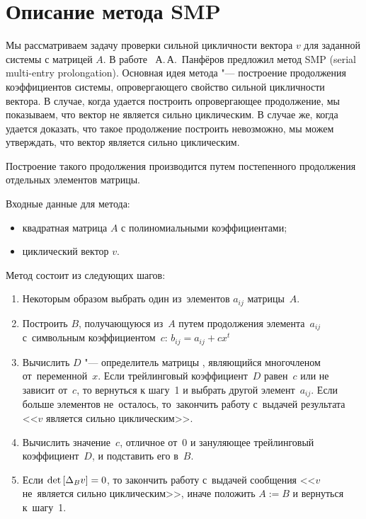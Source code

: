 \section{Описание метода SMP}

Мы рассматриваем задачу проверки сильной цикличности вектора $v$ для заданной системы с матрицей $A$.
В работе~\cite{litPanferov} А.\,А.~Панфёров предложил метод SMP (serial multi-entry prolongation).
Основная идея метода "--- построение продолжения коэффициентов системы,
опровергающего свойство сильной цикличности вектора.
В случае, когда удается построить опровергающее продолжение, мы показываем, что вектор не является сильно циклическим.
В случае же, когда удается доказать, что такое продолжение построить невозможно,
мы можем утверждать, что вектор является сильно циклическим.

Построение такого продолжения производится путем постепенного продолжения отдельных элементов матрицы.
\medskip

Входные данные для метода:
\begin{itemize}
    \item
        квадратная матрица $A$ с полиномиальными коэффициентами;
    \item
        циклический вектор $v$.
\end{itemize}

Метод состоит из следующих шагов:
\begin{enumerate}
    \item
        Некоторым образом выбрать один из~элементов $a_{ij}$ матрицы~$A$.
    \item
        Построить $B$, получающуюся из~$A$ путем продолжения элемента~$a_{ij}$ с~символьным коэффициентом~$c$:
        $b_{ij} = a_{ij} + cx^t$
    \item
        Вычислить $D$ "--- определитель матрицы \diffMatrix[B], являющийся многочленом от~переменной~$x$.
        Если трейлинговый коэффициент~$D$ равен~$c$ или не зависит от~$c$, то вернуться к шагу~1 и выбрать другой элемент~$a_{ij}$.
        Если больше элементов не~осталось, то~закончить работу с~выдачей результата <<$v$ является сильно циклическим>>.
    \item
        Вычислить значение~$c$, отличное от~0 и зануляющее трейлинговый коэффициент~$D$, и подставить его в~$B$.
    \item
        Если $\mathop{\rm det}\text{$ [\Delta_B v] $} = 0$, то закончить работу с~выдачей сообщения <<$v$ не~является сильно циклическим>>,
        иначе положить $A := B$ и вернуться к~шагу~1.
\end{enumerate}

